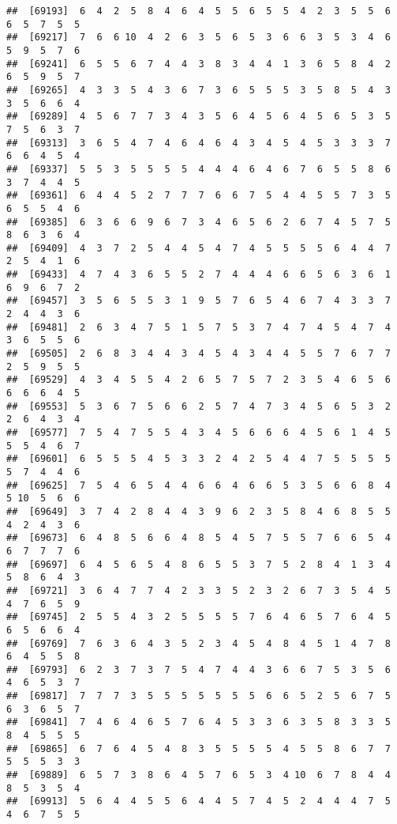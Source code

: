 \documentclass[
]{book}
\begin{document}
\begin{verbatim}
##  [69193]  6  4  2  5  8  4  6  4  5  5  6  5  5  4  2  3  5  5  6  6  5  7  5  5
##  [69217]  7  6  6 10  4  2  6  3  5  6  5  3  6  6  3  5  3  4  6  5  9  5  7  6
##  [69241]  6  5  5  6  7  4  4  3  8  3  4  4  1  3  6  5  8  4  2  6  5  9  5  7
##  [69265]  4  3  3  5  4  3  6  7  3  6  5  5  5  3  5  8  5  4  3  3  5  6  6  4
##  [69289]  4  5  6  7  7  3  4  3  5  6  4  5  6  4  5  6  5  3  5  7  5  6  3  7
##  [69313]  3  6  5  4  7  4  6  4  6  4  3  4  5  4  5  3  3  3  7  6  6  4  5  4
##  [69337]  5  5  3  5  5  5  5  4  4  4  6  4  6  7  6  5  5  8  6  3  7  4  4  5
##  [69361]  6  4  4  5  2  7  7  7  6  6  7  5  4  4  5  5  7  3  5  6  5  5  4  6
##  [69385]  6  3  6  6  9  6  7  3  4  6  5  6  2  6  7  4  5  7  5  8  6  3  6  4
##  [69409]  4  3  7  2  5  4  4  5  4  7  4  5  5  5  5  6  4  4  7  2  5  4  1  6
##  [69433]  4  7  4  3  6  5  5  2  7  4  4  4  6  6  5  6  3  6  1  6  9  6  7  2
##  [69457]  3  5  6  5  5  3  1  9  5  7  6  5  4  6  7  4  3  3  7  2  4  4  3  6
##  [69481]  2  6  3  4  7  5  1  5  7  5  3  7  4  7  4  5  4  7  4  3  6  5  5  6
##  [69505]  2  6  8  3  4  4  3  4  5  4  3  4  4  5  5  7  6  7  7  2  5  9  5  5
##  [69529]  4  3  4  5  5  4  2  6  5  7  5  7  2  3  5  4  6  5  6  6  6  6  4  5
##  [69553]  5  3  6  7  5  6  6  2  5  7  4  7  3  4  5  6  5  3  2  2  6  4  3  4
##  [69577]  7  5  4  7  5  5  4  3  4  5  6  6  6  4  5  6  1  4  5  5  5  4  6  7
##  [69601]  6  5  5  5  4  5  3  3  2  4  2  5  4  4  7  5  5  5  5  5  7  4  4  6
##  [69625]  7  5  4  6  5  4  4  6  6  4  6  6  5  3  5  6  6  8  4  5 10  5  6  6
##  [69649]  3  7  4  2  8  4  4  3  9  6  2  3  5  8  4  6  8  5  5  4  2  4  3  6
##  [69673]  6  4  8  5  6  6  4  8  5  4  5  7  5  5  7  6  6  5  4  6  7  7  7  6
##  [69697]  6  4  5  6  5  4  8  6  5  5  3  7  5  2  8  4  1  3  4  5  8  6  4  3
##  [69721]  3  6  4  7  7  4  2  3  3  5  2  3  2  6  7  3  5  4  5  4  7  6  5  9
##  [69745]  2  5  5  4  3  2  5  5  5  5  7  6  4  6  5  7  6  4  5  6  5  6  6  4
##  [69769]  7  6  3  6  4  3  5  2  3  4  5  4  8  4  5  1  4  7  8  6  4  5  5  8
##  [69793]  6  2  3  7  3  7  5  4  7  4  4  3  6  6  7  5  3  5  6  4  6  5  3  7
##  [69817]  7  7  7  3  5  5  5  5  5  5  5  6  6  5  2  5  6  7  5  6  3  6  5  7
##  [69841]  7  4  6  4  6  5  7  6  4  5  3  3  6  3  5  8  3  3  5  8  4  5  5  5
##  [69865]  6  7  6  4  5  4  8  3  5  5  5  5  4  5  5  8  6  7  7  5  5  5  3  3
##  [69889]  6  5  7  3  8  6  4  5  7  6  5  3  4 10  6  7  8  4  4  8  5  3  5  4
##  [69913]  5  6  4  4  5  5  6  4  4  5  7  4  5  2  4  4  4  7  5  4  6  7  5  5

\end{verbatim}
\end{document}
